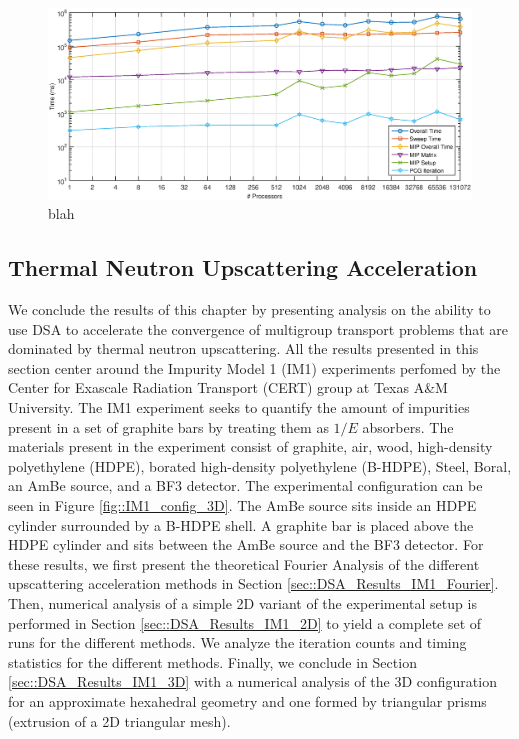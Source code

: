 \begin{figure}
\centering
\includegraphics[width=\textwidth]{figures/sec_DSA/Vulcan_DSA_Timing.eps}
\caption{blah}
\label{fig::DSA_Vulcan_MIP_Timing}
\end{figure}
\fi

\subsection{Thermal Neutron Upscattering Acceleration}
\label{sec::DSA_Results_IM1}

We conclude the results of this chapter by presenting analysis on the ability to use DSA to accelerate the convergence of multigroup transport problems that are dominated by thermal neutron upscattering. All the results presented in this section center around the Impurity Model 1 (IM1) experiments perfomed by the Center for Exascale Radiation Transport (CERT) group at Texas A\&M University. The IM1 experiment seeks to quantify the amount of impurities present in a set of graphite bars by treating them as $1/E$ absorbers. The materials present in the experiment consist of graphite, air, wood, high-density polyethylene (HDPE), borated high-density polyethylene (B-HDPE), Steel, Boral, an AmBe source, and a BF3 detector. The experimental configuration can be seen in Figure \ref{fig::IM1_config_3D}. The AmBe source sits inside an HDPE cylinder surrounded by a B-HDPE shell. A graphite bar is placed above the HDPE cylinder and sits between the AmBe source and the BF3 detector. For these results, we first present the theoretical Fourier Analysis of the different upscattering acceleration methods in Section \ref{sec::DSA_Results_IM1_Fourier}. Then, numerical analysis of a simple 2D variant of the experimental setup is performed in Section \ref{sec::DSA_Results_IM1_2D} to yield a complete set of runs for the different methods. We analyze the iteration counts and timing statistics for the different methods. Finally, we conclude in Section \ref{sec::DSA_Results_IM1_3D} with a numerical analysis of the 3D configuration for an approximate hexahedral geometry and one formed by triangular prisms (extrusion of a 2D triangular mesh).

